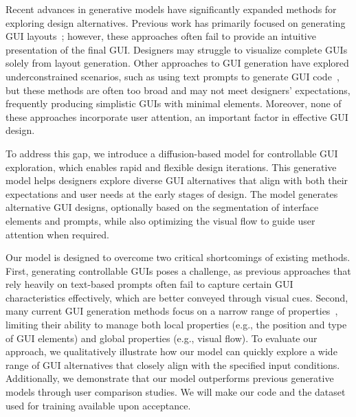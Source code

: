 Recent advances in generative models have significantly expanded methods for exploring design alternatives. Previous work has primarily focused on generating GUI layouts~\cite{cheng2023play, cheng2024colay}; however, these approaches often fail to provide an intuitive presentation of the final GUI. Designers may struggle to visualize complete GUIs solely from layout generation. Other approaches to GUI generation have explored underconstrained scenarios, such as using text prompts to generate GUI code~\cite{wu2024uicoder}, but these methods are often too broad and may not meet designers' expectations, frequently producing simplistic GUIs with minimal elements. Moreover, none of these approaches incorporate user attention, an important factor in effective GUI design. 

To address this gap, we introduce a diffusion-based model for controllable GUI exploration, which enables rapid and flexible design iterations. This generative model helps designers explore diverse GUI alternatives that align with both their expectations and user needs at the early stages of design. 
The model generates alternative GUI designs, optionally based on the segmentation of interface elements and prompts, while also optimizing the visual flow to guide user attention when required.

Our model is designed to overcome two critical shortcomings of existing methods. 
First, generating controllable GUIs poses a challenge, as previous approaches that rely heavily on text-based prompts often fail to capture certain GUI characteristics effectively, which are better conveyed through visual cues.
Second, many current GUI generation methods focus on a narrow range of properties~\cite{cheng2023play, cheng2024colay}, limiting their ability to manage both local properties (e.g., the position and type of GUI elements) and global properties (e.g., visual flow).
%
To evaluate our approach, we qualitatively illustrate how our model can quickly explore a wide range of GUI alternatives that closely align with the specified input conditions. Additionally, we demonstrate that our model outperforms previous generative models through user comparison studies. We will make our code and the dataset used for training available upon acceptance.

